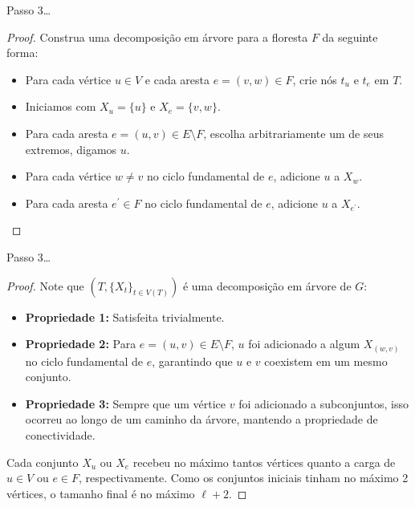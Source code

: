 \begin{frame}{Passo 3\dots}
    \begin{proof}
        Construa uma decomposição em árvore para a floresta $F$ da seguinte forma:
        \begin{itemize}[-]
            \item Para cada vértice $u \in V$ e cada aresta $e = (v, w) \in F$, crie nós $t_u$ e $t_e$ em $T$.
            \item Iniciamos com $X_u = \{u\}$ e $X_e = \{v, w\}$.
            \item Para cada aresta $e = (u, v) \in E \setminus F$, escolha arbitrariamente um de seus extremos, digamos $u$.
            \item Para cada vértice $w \neq v$ no ciclo fundamental de $e$, adicione $u$ a $X_w$.
            \item Para cada aresta $e^\prime \in F$ no ciclo fundamental de $e$, adicione $u$ a $X_{e^\prime}$.
        \end{itemize}
        \phantom{\qedhere}
    \end{proof}
\end{frame}

\begin{frame}{Passo 3\dots}
    \begin{proof}
        Note que $(T, \{X_t\}_{t \in V(T)})$ é uma decomposição em árvore de $G$:
        \bigbreak

        \begin{itemize}
            \item \textbf{Propriedade 1:} Satisfeita trivialmente.
            \item \textbf{Propriedade 2:} Para $e = (u,v) \in E \setminus F$, $u$ foi adicionado a algum $X_{(w,v)}$ no ciclo fundamental de $e$, garantindo que $u$ e $v$ coexistem em um mesmo conjunto.
            \item \textbf{Propriedade 3:} Sempre que um vértice $v$ foi adicionado a subconjuntos, isso ocorreu ao longo de um caminho da árvore, mantendo a propriedade de conectividade.
        \end{itemize}
        \pause\bigbreak

        Cada conjunto $X_u$ ou $X_e$ recebeu no máximo tantos vértices quanto a carga de $u \in V$ ou $e \in F$, respectivamente. Como os conjuntos iniciais tinham no máximo 2 vértices, o tamanho final é no máximo $\ell + 2$.
    \end{proof}
\end{frame}

